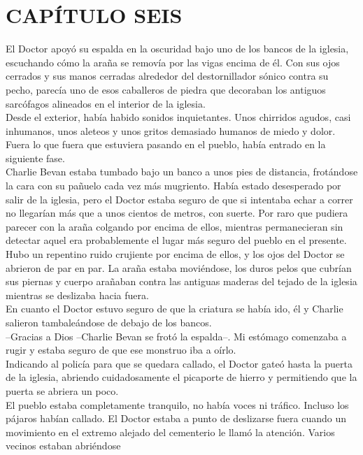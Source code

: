 \chapter*{CAPÍTULO SEIS}
El Doctor apoyó su espalda en la oscuridad bajo uno de los bancos de la
iglesia, escuchando cómo la araña se removía por las vigas encima de él.
Con sus ojos cerrados y sus manos cerradas alrededor del destornillador
sónico contra su pecho, parecía uno de esos caballeros de piedra que
decoraban los antiguos sarcófagos alineados en el interior de la
iglesia.\\
Desde el exterior, había habido sonidos inquietantes. Unos chirridos
agudos, casi inhumanos, unos aleteos y unos gritos demasiado humanos de
miedo y dolor. Fuera lo que fuera que estuviera pasando en el pueblo,
había entrado en la siguiente fase.\\
Charlie Bevan estaba tumbado bajo un banco a unos pies de distancia,
frotándose la cara con su pañuelo cada vez más mugriento. Había estado
desesperado por salir de la iglesia, pero el Doctor estaba seguro de que
si intentaba echar a correr no llegarían más que a unos cientos de
metros, con suerte. Por raro que pudiera parecer con la araña colgando
por encima de ellos, mientras permanecieran sin detectar aquel era
probablemente el lugar más seguro del pueblo en el presente.\\
Hubo un repentino ruido crujiente por encima de ellos, y los ojos del
Doctor se abrieron de par en par. La araña estaba moviéndose, los duros
pelos que cubrían sus piernas y cuerpo arañaban contra las antiguas
maderas del tejado de la iglesia mientras se deslizaba hacia fuera.\\
En cuanto el Doctor estuvo seguro de que la criatura se había ido, él y
Charlie salieron tambaleándose de debajo de los bancos.\\
--Gracias a Dios --Charlie Bevan se frotó la espalda--. Mi estómago
comenzaba a rugir y estaba seguro de que ese monstruo iba a oírlo.\\
Indicando al policía para que se quedara callado, el Doctor gateó hasta
la puerta de la iglesia, abriendo cuidadosamente el picaporte de hierro
y permitiendo que la puerta se abriera un poco.\\
El pueblo estaba completamente tranquilo, no había voces ni tráfico.
Incluso los pájaros habían callado. El Doctor estaba a punto de
deslizarse fuera cuando un movimiento en el extremo alejado del
cementerio le llamó la atención. Varios vecinos estaban abriéndose

